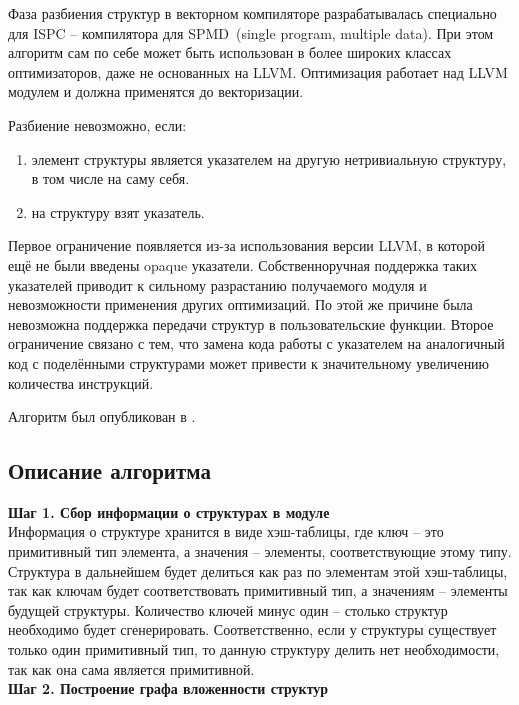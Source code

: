 Фаза разбиения структур в векторном компиляторе разрабатывалась специально для ISPC -- компилятора для SPMD~(single program, multiple data). При этом алгоритм сам по себе может быть использован в более широких классах оптимизаторов, даже не основанных на LLVM. Оптимизация работает над LLVM модулем и должна применятся до векторизации.

Разбиение невозможно, если:
\begin{enumerate}
\item элемент структуры является указателем на другую нетривиальную структуру, в том числе на саму себя.
\item на структуру взят указатель.
\end{enumerate}

Первое ограничение появляется из-за использования версии LLVM, в которой ещё не были введены opaque указатели.
Собственноручная поддержка таких указателей приводит к сильному разрастанию получаемого модуля и невозможности применения других оптимизаций.
По этой же причине была невозможна поддержка передачи структур в пользовательские функции.
Второе ограничение связано с тем, что замена кода работы с указателем на аналогичный код с поделёнными структурами может привести к значительному увеличению количества инструкций.

Алгоритм был опубликован в \cite{vladimirov2022opt2}.

\subsection{Описание алгоритма}\label{subsec:lowering/splitter/algorithm}

\textbf{Шаг 1. Сбор информации о структурах в модуле}\\

Информация о структуре хранится в виде хэш-таблицы, где ключ -- это примитивный тип элемента, а значения -- элементы, соответствующие этому типу. Структура в дальнейшем будет делиться как раз по элементам этой хэш-таблицы, так как ключам будет соответствовать примитивный тип, а значениям -- элементы будущей структуры. 
Количество ключей минус один -- столько структур необходимо будет сгенерировать.
Соответственно, если у структуры существует только один примитивный тип, то данную структуру делить нет необходимости, так как она сама является примитивной.\\

\textbf{Шаг 2. Построение графа вложенности структур}\\

